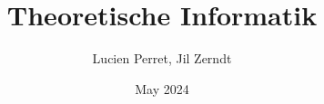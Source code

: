 \documentclass[a4paper, fontsize = 8pt, landscape]{scrartcl}
\title{Theoretische Informatik}
\author{Lucien Perret, Jil Zerndt}
\date{May 2024}
\begin{document}
\begin{multicols*}{3}
    \thispagestyle{TitlePageStyle}
		\maketitle

    
    \raggedcolumns
    
    \raggedcolumns
    
    \raggedcolumns
    
    \raggedcolumns
    
    \raggedcolumns
    
    \raggedcolumns
    
    \raggedcolumns
    
    \raggedcolumns
    
    \raggedcolumns
    
    \raggedcolumns

\end{multicols*}
\end{document}
